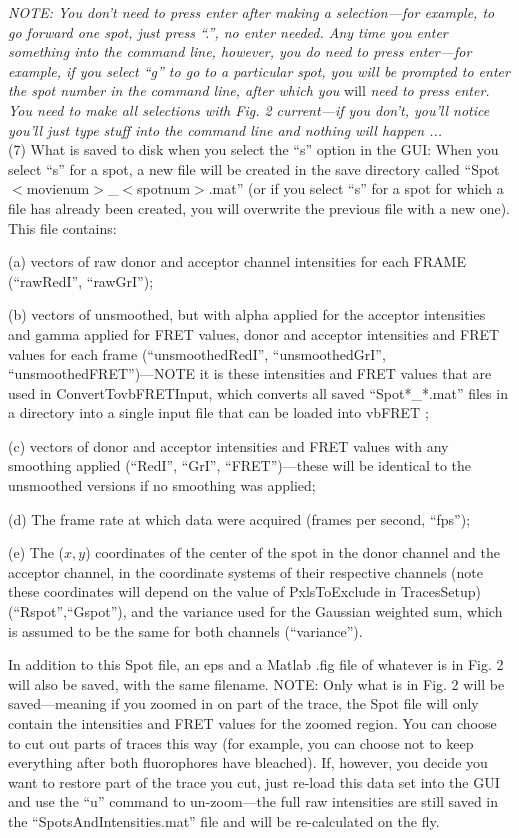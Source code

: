 \documentclass[11pt]{article}
\begin{document}
{\it NOTE: You don't need to press enter after making a selection---for example, to go forward one spot, just press ``.'', no enter needed.  Any time you enter something into the command line, however, you do need to press enter---for example, if you select ``g'' to go to a particular spot, you will be prompted to enter the spot number in the command line, after which you } will {\it need to press enter.  You need to make all selections with Fig. 2 current---if you don't, you'll notice you'll just type stuff into the command line and nothing will happen ... }\\

\noindent (7) What is saved to disk when you select the ``s''  option in the GUI: When you select ``s'' for a spot, a new file will be created in the save directory called ``Spot$<$movienum$>$\_$<$spotnum$>$.mat'' (or if you select ``s'' for a spot for which a file has already been created, you will overwrite the previous file with a new one).  This file contains: 

(a) vectors of raw donor and acceptor channel intensities for each FRAME (``rawRedI'', ``rawGrI''); 

(b) vectors of unsmoothed, but with alpha applied for the acceptor intensities and gamma applied for FRET values, donor and acceptor intensities and FRET values for each frame (``unsmoothedRedI'', ``unsmoothedGrI'', ``unsmoothedFRET'')---NOTE it is these intensities and FRET values that are used in ConvertTovbFRETInput, which converts all saved ``Spot*\_*.mat'' files in a directory into a single input file that can be loaded into vbFRET \cite{Bronson2009};

(c) vectors of donor and acceptor intensities and FRET values with any smoothing applied (``RedI'', ``GrI'', ``FRET'')---these will be identical to the unsmoothed versions if no smoothing was applied;

(d) The frame rate at which data were acquired (frames per second, ``fps'');

(e) The ($x,y$) coordinates of the center of the spot in the donor channel and the acceptor channel, in the coordinate systems of their respective channels (note these coordinates will depend on the value of PxlsToExclude in TracesSetup) (``Rspot'',``Gspot''), and the variance used for the Gaussian weighted sum, which is assumed to be the same for both channels (``variance'').

In addition to this Spot file, an eps and a Matlab .fig file of whatever is in Fig. 2 will also be saved, with the same filename.  NOTE: Only what is in Fig. 2 will be saved---meaning if you zoomed in on part of the trace, the Spot file will only contain the intensities and FRET values for the zoomed region.  You can choose to cut out parts of traces this way (for example, you can choose not to keep everything after both fluorophores have bleached).  If, however, you decide you want to restore part of the trace you cut, just re-load this data set into the GUI and use the ``u'' command to un-zoom---the full raw intensities are still saved in the ``SpotsAndIntensities.mat'' file and will be re-calculated on the fly.
\end{document}
